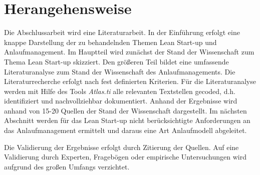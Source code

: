 \documentclass[%
a4paper,
aps,
pra,
 longbibliography,
 lengthcheck,%
]{revtex4-1}
\begin{document}
\section{Herangehensweise}
Die Abschlussarbeit wird eine Literaturarbeit. In der Einführung erfolgt eine knappe Darstellung der zu behandelnden Themen Lean Start-up und Anlaufmanagement. Im Hauptteil wird zunächst der Stand der Wissenschaft zum Thema Lean Start-up skizziert. Den größeren Teil bildet eine umfassende Literaturanalyse zum Stand der Wissenschaft des Anlaufmanagements. Die Literaturrecherche erfolgt nach fest definierten Kriterien. Für die Literaturanalyse werden mit Hilfe des Tools \textit{Atlas.ti} alle relevanten Textstellen gecoded, d.h. identifiziert und nachvollziehbar dokumentiert. Anhand der  Ergebnisse wird anhand von 15-20 Quellen der Stand der Wissenschaft dargestellt. Im nächsten Abschnitt werden für das Lean Start-up nicht berücksichtigte Anforderungen an das Anlaufmanagement ermittelt und daraus eine Art Anlaufmodell abgeleitet. 

Die Validierung der Ergebnisse erfolgt durch Zitierung der Quellen. Auf eine Validierung durch Experten, Fragebögen oder empirische Untersuchungen wird aufgrund des großen Umfangs verzichtet. 

\vspace{1cm}

\end{document}
